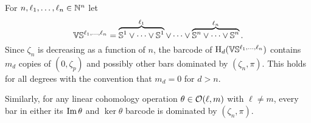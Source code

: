 \subsubsection{}

For $n, \ell_1, \dots, \ell_n \in \mathbb{N}^n$ let
\[
\mathbb{V}\mathbb{S}^{\ell_1,\dots,\ell_n} = 
\overbrace{\mathbb{S}^1\vee\dots\vee\mathbb{S}^1}^{\ell_1} \vee\dots\vee \overbrace{\mathbb{S}^n\vee\dots\vee\mathbb{S}^n}^{\ell_n}.
\]
Since $\zeta_{n}$ is decreasing as a function of $n$, the barcode of $\mathrm{H}_d(\mathbb{V}\mathbb{S}^{\ell_1,\dots,\ell_n})$ contains $m_d$ copies of $(0,\zeta_p)$ and possibly other bars dominated by $(\zeta_n,\pi)$.
This holds for all degrees with the convention that $m_d = 0$ for $d > n$.

Similarly, for any linear cohomology operation $\theta \in \mathcal{O}(\ell,m)$ with $\ell \neq m$, every bar in either its $\operatorname{Im}\theta$ and $\ker\theta$ barcode is dominated by $(\zeta_n, \pi)$.

%
%




